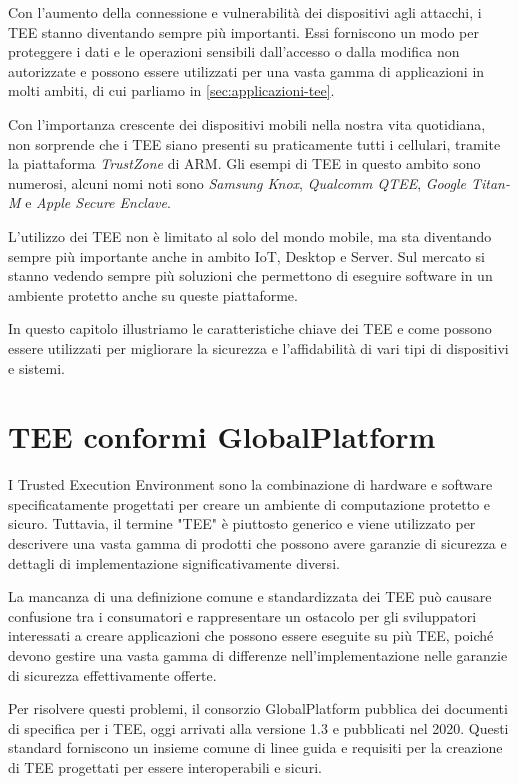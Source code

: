 \documentclass[12pt,italian]{report}
\begin{document}
Con l'aumento della connessione e vulnerabilità dei dispositivi agli
attacchi, i TEE stanno diventando sempre più importanti.
Essi forniscono un modo per proteggere i dati e le operazioni sensibili
dall'accesso o dalla modifica non autorizzate e possono
essere utilizzati per una vasta gamma di applicazioni
in molti ambiti, di cui parliamo in \ref{sec:applicazioni-tee}.

Con l'importanza crescente dei dispositivi mobili nella nostra
vita quotidiana, non sorprende che i TEE siano presenti su praticamente
tutti i cellulari, tramite la piattaforma \textit{TrustZone} di ARM.
Gli esempi di TEE in questo ambito sono numerosi, alcuni nomi noti sono
\textit{Samsung Knox}, \textit{Qualcomm QTEE}, \textit{Google Titan-M}
e \textit{Apple Secure Enclave}.

L'utilizzo dei TEE non è limitato al solo del mondo mobile,
ma sta diventando sempre più importante anche in ambito IoT, Desktop e Server.
Sul mercato si stanno vedendo sempre più soluzioni che permettono di 
eseguire software in un ambiente protetto anche su queste piattaforme.

In questo capitolo illustriamo le caratteristiche chiave dei TEE e come
possono essere utilizzati per migliorare la sicurezza e l'affidabilità di
vari tipi di dispositivi e sistemi.

\section{TEE conformi GlobalPlatform}
\label{sec:tee-conformi-globalplatform}
I Trusted Execution Environment sono la combinazione di hardware e software
specificatamente progettati per creare un ambiente di computazione protetto e sicuro.
Tuttavia, il termine "TEE" è piuttosto generico e viene utilizzato per
descrivere una vasta gamma di prodotti che possono avere garanzie di
sicurezza e dettagli di implementazione significativamente diversi.

La mancanza di una definizione comune e standardizzata dei TEE
può causare confusione tra i consumatori e rappresentare un ostacolo per
gli sviluppatori interessati a creare applicazioni che possono essere
eseguite su più TEE,
poiché devono gestire una vasta gamma di differenze nell'implementazione
nelle garanzie di sicurezza effettivamente offerte.

Per risolvere questi problemi, il consorzio GlobalPlatform pubblica
dei documenti di specifica per i TEE, oggi arrivati alla
versione 1.3 e pubblicati nel 2020.
Questi standard forniscono un insieme comune di linee guida e requisiti per
la creazione di TEE progettati per essere interoperabili e sicuri.
\end{document}
